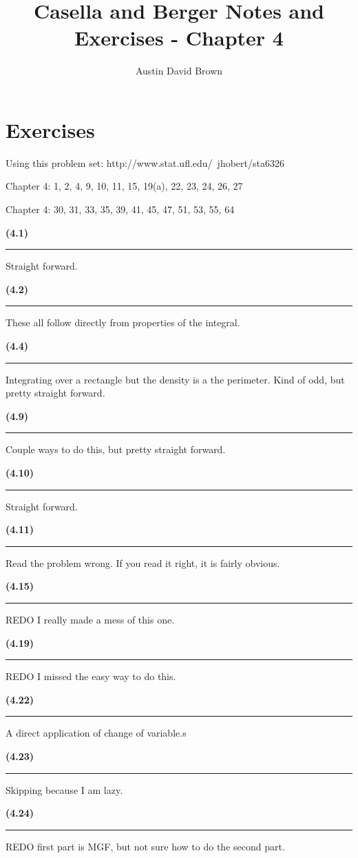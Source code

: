 \documentclass[12pt, reqno]{amsart}
\numberwithin{equation}{section}
\begin{document}
\title{Casella and Berger Notes and Exercises -  Chapter 4}
\author{Austin David Brown}
\maketitle

\section*{Exercises}

Using this problem set:
http://www.stat.ufl.edu/~jhobert/sta6326

Chapter 4: 1, 2, 4, 9, 10, 11, 15, 19(a), 22, 23, 24, 26, 27

Chapter 4: 30, 31, 33, 35, 39, 41, 45, 47, 51, 53, 55, 64

{\bf (4.1)\rule{\textwidth}{.5pt}}

Straight forward.

{\bf (4.2)\rule{\textwidth}{.5pt}}

These all follow directly from properties of the integral.

{\bf (4.4)\rule{\textwidth}{.5pt}}

Integrating over a rectangle but the density is a the perimeter. Kind of odd, but pretty straight forward.

{\bf (4.9)\rule{\textwidth}{.5pt}}

Couple ways to do this, but pretty straight forward.

{\bf (4.10)\rule{\textwidth}{.5pt}}

Straight forward.

{\bf (4.11)\rule{\textwidth}{.5pt}}

Read the problem wrong. If you read it right, it is fairly obvious.

{\bf (4.15)\rule{\textwidth}{.5pt}}

REDO I really made a mess of this one.

{\bf (4.19)\rule{\textwidth}{.5pt}}

REDO I missed the easy way to do this.

{\bf (4.22)\rule{\textwidth}{.5pt}}

A direct application of change of variable.s

{\bf (4.23)\rule{\textwidth}{.5pt}}

Skipping because I am lazy.

{\bf (4.24)\rule{\textwidth}{.5pt}}

REDO first part is MGF, but not sure how to do the second part.
\end{document}
